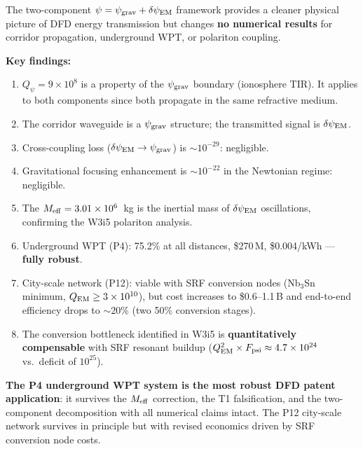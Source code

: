 \documentclass[11pt]{article}
\newcommand{\ee}[1]{\times 10^{#1}}
\newcommand{\psigrav}{\psi_{\rm grav}}
\newcommand{\dpsiEM}{\delta\psi_{\rm EM}}
\newcommand{\Meff}{M_{\rm eff}}
\newcommand{\Qpsi}{Q_\psi}
\begin{document}
\begin{tcolorbox}[colback=green!5!white, colframe=green!60!black,
  title=\textbf{W3i6 P4+P12 Bottom Line}]

The two-component $\psi = \psigrav + \dpsiEM$ framework provides a
cleaner physical picture of DFD energy transmission but changes
\textbf{no numerical results} for corridor propagation, underground WPT,
or polariton coupling.

\textbf{Key findings:}
\begin{enumerate}[nosep]
  \item $\Qpsi = 9\ee{8}$ is a property of the $\psigrav$ boundary
    (ionosphere TIR). It applies to both components since both propagate
    in the same refractive medium.
  \item The corridor waveguide is a $\psigrav$ structure; the transmitted
    signal is $\dpsiEM$.
  \item Cross-coupling loss ($\dpsiEM \to \psigrav$) is $\sim 10^{-29}$:
    negligible.
  \item Gravitational focusing enhancement is $\sim 10^{-22}$ in the
    Newtonian regime: negligible.
  \item The $\Meff = 3.01\ee{6}$~kg is the inertial mass of $\dpsiEM$
    oscillations, confirming the W3i5 polariton analysis.
  \item Underground WPT (P4): 75.2\% at all distances, \$270\,M,
    \$0.004/kWh --- \textbf{fully robust}.
  \item City-scale network (P12): viable with SRF conversion nodes
    (Nb$_3$Sn minimum, $Q_{\rm EM} \geq 3\ee{10}$), but cost increases
    to \$0.6--1.1\,B and end-to-end efficiency drops to $\sim 20\%$
    (two 50\% conversion stages).
  \item The conversion bottleneck identified in W3i5 is \textbf{quantitatively
    compensable} with SRF resonant buildup ($Q_{\rm EM}^2 \times
    F_{\rm psi} \approx 4.7\ee{24}$ vs.\ deficit of $10^{25}$).
\end{enumerate}

\textbf{The P4 underground WPT system is the most robust DFD patent
application}: it survives the $\Meff$ correction, the T1 falsification,
and the two-component decomposition with all numerical claims intact.
The P12 city-scale network survives in principle but with revised
economics driven by SRF conversion node costs.
\end{tcolorbox}
\end{document}
